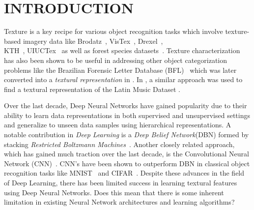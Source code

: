 \documentclass[11pt,a4paper]{article}
\begin{document}
\section{INTRODUCTION}
Texture is a key recipe for various object recognition tasks which involve texture-based imagery data like Brodatz~\cite{brodatz}, VisTex~\cite{vistex}, Drexel~\cite{drexel}, \\KTH~\cite{kth}, UIUCTex~\cite{lazebnik} as well as forest species datasets~\cite{forestSpecies2009}. Texture characterization has also been shown to be useful in addressing other object categorization problems like the Brazilian Forensic Letter Database (BFL)~\cite{bfl} which was later converted into a \emph{textural representation} in \cite{writerVerification}. In \cite{CIARP2013}, a similar approach was used to find a textural representation of the Latin Music Dataset \cite{LatinMusicDatabase2008}.   

Over the last decade, Deep Neural Networks have gained popularity due to their ability to learn data representations in both supervised and unsupervised settings and generalize to unseen data samples using hierarchical representations. A notable contribution in \emph{Deep Learning} is a \emph{Deep Belief Network}(DBN) formed by stacking \emph{Restricted Boltzmann Machines}~\cite{Hinton06afast}. Another closely related approach, which has gained much traction over the last decade, is the Convolutional Neural Network (CNN)~\cite{Lecun98gradient-basedlearning}. CNN's have been shown to outperform DBN in classical object recognition tasks like MNIST~\cite{mnist} and CIFAR~\cite{Krizhevsky09learningmultiple}. Despite these advances in the field of Deep Learning, there has been limited success in learning textural features using Deep Neural Networks. Does this mean that there is some inherent limitation in existing Neural Network architectures and learning algorithms? 
\end{document}
